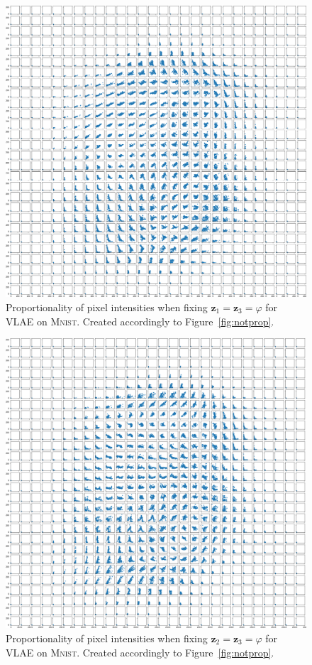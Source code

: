 \begin{figure}[H]
    \centering
    \includegraphics[width=\textwidth]{images/notprop/mnist/vlae/ccs_0_2_vlae.png}
    \caption[VLAE Pixel Proportionality - $\bm{z}_1$ vs. $\bm{z}_3$]{Proportionality of pixel intensities when fixing $\bm{z}_1 = \bm{z}_3=\varphi$ for \ac{VLAE} on \textsc{Mnist}. Created accordingly to Figure~\ref{fig:notprop}.}
\end{figure}

\begin{figure}[H]
    \centering
    \includegraphics[width=\textwidth]{images/notprop/mnist/vlae/ccs_1_2_vlae.png}
    \caption[VLAE Pixel Proportionality - $\bm{z}_2$ vs. $\bm{z}_3$]{Proportionality of pixel intensities when fixing $\bm{z}_2 = \bm{z}_3=\varphi$ for \ac{VLAE} on \textsc{Mnist}. Created accordingly to Figure~\ref{fig:notprop}.}
\end{figure}

